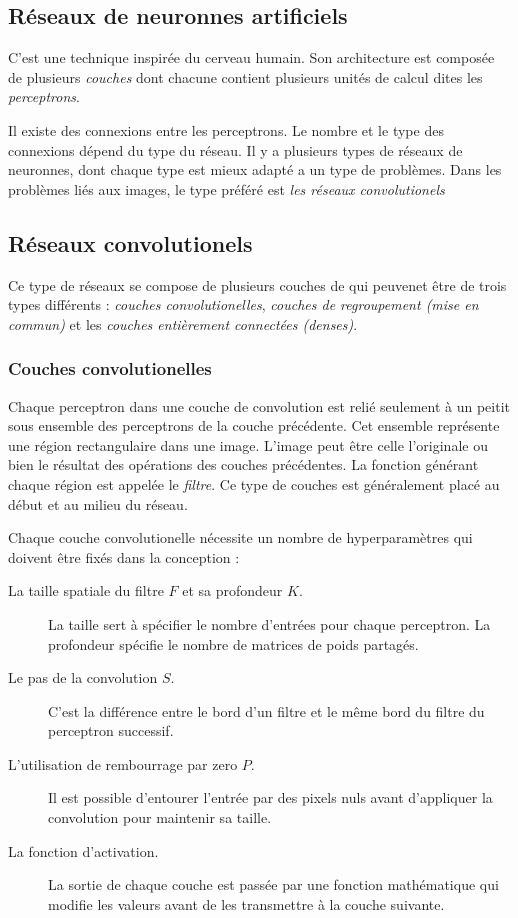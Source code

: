 \subsection{Réseaux de neuronnes artificiels}

C'est une technique inspirée du cerveau humain. Son architecture est composée de
plusieurs \emph{couches} dont chacune contient plusieurs unités de calcul dites
les \emph{perceptrons}.

Il existe des connexions entre les perceptrons. Le nombre et le type des
connexions dépend du type du réseau. Il y a plusieurs types de réseaux de
neuronnes, dont chaque type est mieux adapté a un type de problèmes. Dans les
problèmes liés aux images, le type préféré est \emph{les réseaux convolutionels}

\subsection{Réseaux convolutionels}

Ce type de réseaux se compose de plusieurs couches de qui peuvenet être de trois
types différents : \emph{couches convolutionelles},
\emph{couches de regroupement (mise en commun)} et les
\emph{couches entièrement connectées (denses)}.

\subsubsection{Couches convolutionelles}

Chaque perceptron dans une couche de convolution est relié seulement à un peitit
sous ensemble des perceptrons de la couche précédente. Cet ensemble représente
une région rectangulaire dans une image. L'image peut être celle l'originale ou
bien le résultat des opérations des couches précédentes. La fonction générant
chaque région est appelée le \emph{filtre}. Ce type de couches est généralement
placé au début et au milieu du réseau.

Chaque couche convolutionelle nécessite un nombre de hyperparamètres qui doivent
être fixés dans la conception :

\begin{description}
  \item[La taille spatiale du filtre $F$ et sa profondeur $K$.] La taille sert à
  spécifier le nombre d'entrées pour chaque perceptron. La profondeur spécifie
  le nombre de matrices de poids partagés.
  \item[Le pas de la convolution $S$.] C'est la différence entre le bord d'un
  filtre et le même bord du filtre du perceptron successif.
  \item[L'utilisation de rembourrage par zero $P$.] Il est possible d'entourer
  l'entrée par des pixels nuls avant d'appliquer la convolution pour maintenir
  sa taille.
  \item[La fonction d'activation.] La sortie de chaque couche est passée par une
  fonction mathématique qui modifie les valeurs avant de les transmettre à la
  couche suivante.
\end{description}

